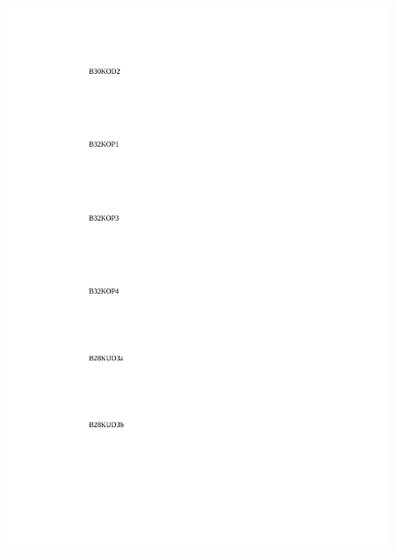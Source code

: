 \begin{figure}[htbp]
	\begin{center}
		\includegraphics[scale=0.7]{Appendices/Figures/FIBScans/FibScans2}
		\caption{}
		\label{Fig:App:FibScans2}
	\end{center}
\end{figure}
